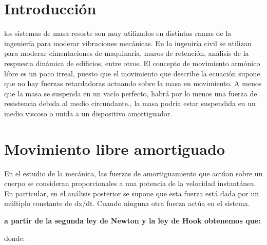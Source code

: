 \documentclass[12pt,a4paper]{article}
\begin{document}
\section*{Introducción}
los sistemas de masa-resorte son muy utilizados en distintas ramas de la ingeniería para moderar vibraciones mecánicas. En la ingeniría civil se utilizan para moderar cimentaciones de maquinaria, muros de retención, análisis de la respuesta dinámica de edificios, entre otros.
\vspace{0.6cm}
El concepto de movimiento armónico libre es un poco irreal, puesto que el movimiento
que describe la ecuación supone que no hay fuerzas retardadoras actuando sobre
la masa en movimiento. A menos que la masa se suspenda en un vacío perfecto, habrá
por lo menos una fuerza de resistencia debida al medio circundante., la masa podría estar suspendida en un medio viscoso o unida a un
dispositivo amortiguador.
 
\vspace{0.6cm}

\section*{Movimiento libre amortiguado}
En el estudio de la mecánica, las fuerzas de amortiguamiento que actúan sobre un cuerpo se consideran proporcionales a una potencia de la velocidad instantánea. En particular, en el análisis posterior se supone que esta fuerza está dada por un múltiplo constante de dx/dt.
Cuando ninguna otra fuerza actúa en el sistema.\\

\vspace{0.6cm}

{\textbf{a partir de la segunda ley de Newton y la ley de Hook obtenemos que:}\\}


\vspace{0.4cm}

donde:

\vspace{0.6cm}
\end{document}
